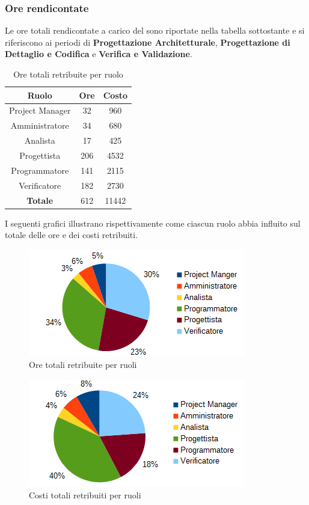 		\subsubsection{Ore rendicontate}
		Le ore totali rendicontate a carico del  sono riportate nella tabella sottostante e si riferiscono ai periodi di \textbf{Progettazione Architetturale}, \textbf{Progettazione di Dettaglio e Codifica} e \textbf{Verifica e Validazione}. \\
		\begin{table}[H]
		\centering
		\begin{tabular}{|c|c|c|}
			\hline
			\textbf{Ruolo}		& \textbf{Ore}	& \textbf{Costo} \\
			\hline
			Project Manager		& 32			& 960	\\
			Amministratore		& 34			& 680	\\
			Analista			& 17			& 425	\\
			Progettista			& 206			& 4532	\\
			Programmatore		& 141			& 2115	\\
			Verificatore		& 182			& 2730	\\
			\hline
			\textbf{Totale}		& 612			& 11442	\\
			\hline
		\end{tabular}
		\caption{Ore totali retribuite per ruolo}
		\end{table}
		I seguenti grafici illustrano rispettivamente come ciascun ruolo abbia influito sul totale delle ore e dei costi retribuiti. \\
		\begin{figure}[H]
		\centering
			\includegraphics[scale=1]{immagini/grafici/orario_rendicontato-torta.png}
			\caption{Ore totali retribuite per ruoli}
		\end{figure}
		\begin{figure}[H]
			\centering
			\includegraphics[scale=1]{immagini/grafici/orario_rendicontato-torta-costo.png}
			\caption{Costi totali retribuiti per ruoli}
		\end{figure}
